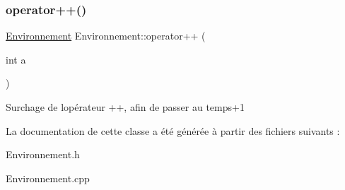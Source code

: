 \subsubsection{\texorpdfstring{operator++()}{operator++()}}
{\footnotesize\ttfamily \mbox{\hyperlink{class_environnement}{Environnement}} Environnement\+::operator++ (\begin{DoxyParamCaption}\item[{int}]{a }\end{DoxyParamCaption})}

Surchage de l\textquotesingle{}opérateur ++, afin de passer au temps+1 

La documentation de cette classe a été générée à partir des fichiers suivants \+:\begin{DoxyCompactItemize}
\item 
Environnement.\+h\item 
Environnement.\+cpp\end{DoxyCompactItemize}
